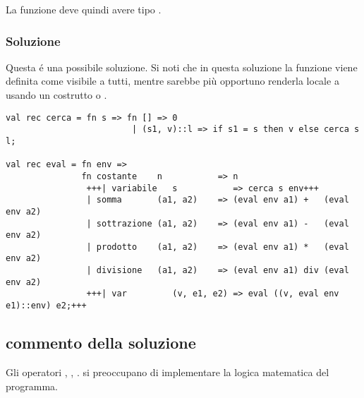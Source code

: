 \medskip
La funzione  deve quindi avere tipo .

\subsubsection{Soluzione}

Questa é una possibile soluzione. %
Si noti che in questa soluzione la funzione  viene definita come visibile a tutti, mentre sarebbe più opportuno renderla locale a  usando un costrutto  o .

\begin{lstlisting}[style = SML, caption = {Definizione della funzione \sml{eval}}]
val rec cerca = fn s => fn [] => 0
						 | (s1, v)::l => if s1 = s then v else cerca s l;

val rec eval = fn env =>
			   fn costante    n           => n
				+++| variabile   s           => cerca s env+++
				| somma       (a1, a2)    => (eval env a1) +   (eval env a2)
				| sottrazione (a1, a2)    => (eval env a1) -   (eval env a2)
				| prodotto    (a1, a2)    => (eval env a1) *   (eval env a2)
				| divisione   (a1, a2)    => (eval env a1) div (eval env a2)
				+++| var         (v, e1, e2) => eval ((v, eval env e1)::env) e2;+++
\end{lstlisting}

\subsection{commento della soluzione}

Gli operatori \sml{+}, \sml{-}, \sml{*}.  si preoccupano di implementare la logica matematica del programma.
